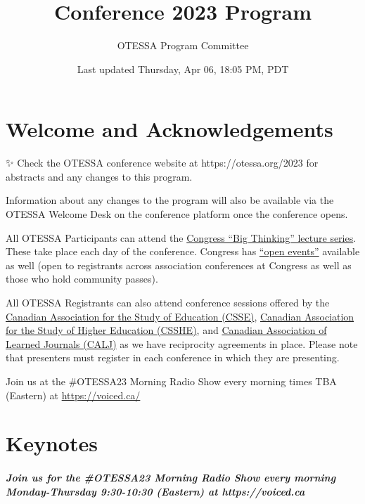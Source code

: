 \documentclass[
]{book}
\title{Conference 2023 Program}
\author{OTESSA Program Committee}
\date{Last updated Thursday, Apr 06, 18:05 PM, PDT}
\begin{document}
\maketitle

{
\setcounter{tocdepth}{1}
\tableofcontents
}
\hypertarget{welcome-and-acknowledgements}{%
\chapter*{Welcome and Acknowledgements}\label{welcome-and-acknowledgements}}

\begin{protip}
✨ Check the OTESSA conference website at https://otessa.org/2023 for
abstracts and any changes to this program.

Information about any changes to the program will also be available via
the OTESSA Welcome Desk on the conference platform once the conference
opens.
\end{protip}

All OTESSA Participants can attend the \href{https://www.federationhss.ca/en/congress/congress-2022/open-programming}{Congress ``Big Thinking'' lecture series}. These take place each day of the conference. Congress has \href{https://www.federationhss.ca/en/congress/congress-2022/calendar-open-events}{``open events''} available as well (open to registrants across association conferences at Congress as well as those who hold community passes).

All OTESSA Registrants can also attend conference sessions offered by the \href{https://csse-scee.ca/}{Canadian Association for the Study of Education (CSSE)}, \href{https://csshe-scees.ca/}{Canadian Association for the Study of Higher Education (CSSHE)}, and \href{https://www.calj-acrs.ca/}{Canadian Association of Learned Journals (CALJ)} as we have reciprocity agreements in place. Please note that presenters must register in each conference in which they are presenting.

Join us at the \#OTESSA23 Morning Radio Show every morning times TBA (Eastern) at \url{https://voiced.ca/}

\hypertarget{keynotes}{%
\chapter*{Keynotes}\label{keynotes}}

\begin{protip}
\hypertarget{join-us-for-the-otessa23-morning-radio-show-every-morning-monday-thursday-930-1030-eastern-at-httpsvoiced.ca}{%
\paragraph{Join us for the \#OTESSA23 Morning Radio Show every morning
Monday-Thursday 9:30-10:30 (Eastern) at
https://voiced.ca}\label{join-us-for-the-otessa23-morning-radio-show-every-morning-monday-thursday-930-1030-eastern-at-httpsvoiced.ca}}
\end{protip}
\end{document}
